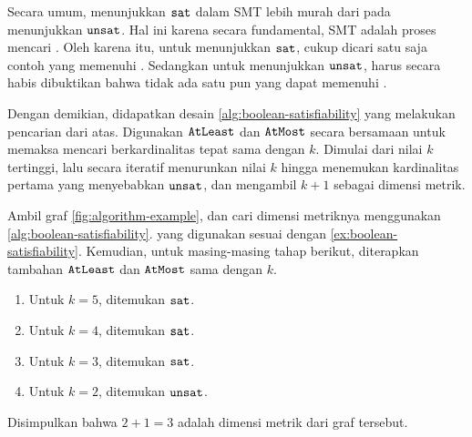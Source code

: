 Secara umum, menunjukkan \(\mathtt{sat}\) dalam SMT lebih murah dari pada menunjukkan \(\mathtt{unsat}\). Hal ini karena secara fundamental, SMT adalah proses mencari . Oleh karena itu, untuk menunjukkan \(\mathtt{sat}\), cukup dicari satu saja contoh yang memenuhi . Sedangkan untuk menunjukkan \(\mathtt{unsat}\), harus secara habis dibuktikan bahwa tidak ada satu pun  yang dapat memenuhi .

Dengan demikian, didapatkan desain \autoref{alg:boolean-satisfiability} yang melakukan pencarian dari atas. Digunakan \(\mathtt{AtLeast}\) dan \(\mathtt{AtMost}\) secara bersamaan untuk memaksa mencari  berkardinalitas tepat sama dengan \(k\). Dimulai dari nilai \(k\) tertinggi, lalu secara iteratif menurunkan nilai \(k\) hingga menemukan kardinalitas pertama yang menyebabkan \(\mathtt{unsat}\), dan mengambil \(k + 1\) sebagai dimensi metrik.

\begin{example}
	Ambil graf \autoref{fig:algorithm-example}, dan cari dimensi metriknya menggunakan \autoref{alg:boolean-satisfiability}.  yang digunakan sesuai dengan \autoref{ex:boolean-satisfiability}. Kemudian, untuk masing-masing tahap berikut, diterapkan  tambahan \(\mathtt{AtLeast}\) dan \(\mathtt{AtMost}\) sama dengan \(k\).
	\begin{enumerate}
		\item Untuk \(k = 5\), ditemukan \(\mathtt{sat}\).
		\item Untuk \(k = 4\), ditemukan \(\mathtt{sat}\).
		\item Untuk \(k = 3\), ditemukan \(\mathtt{sat}\).
		\item Untuk \(k = 2\), ditemukan \(\mathtt{unsat}\).
	\end{enumerate}
	Disimpulkan bahwa \(2 + 1 = 3\) adalah dimensi metrik dari graf tersebut.
\end{example}

\subsection{}

